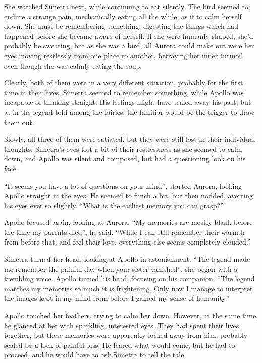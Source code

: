 She watched Simetra next, while continuing to eat silently. The bird seemed to endure a strange pain, mechanically eating all the while, as if to calm herself down. She must be remembering something, digesting the things which had happened before she became aware of herself. If she were humanly shaped, she'd probably be sweating, but as she was a bird, all Aurora could make out were her eyes moving restlessly from one place to another, betraying her inner turmoil even though she was calmly eating the soup.

Clearly, both of them were in a very different situation, probably for the first time in their lives. Simetra seemed to remember something, while Apollo was incapable of thinking straight. His feelings might have sealed away his past, but as in the legend told among the fairies, the familiar would be the trigger to draw them out. 

\fancybreaker{}

Slowly, all three of them were satiated, but they were still lost in their individual thoughts. Simetra's eyes lost a bit of their restlessness as she seemed to calm down, and Apollo was silent and composed, but had a questioning look on his face.

\enquote{It seems you have a lot of questions on your mind}, started Aurora, looking Apollo straight in the eyes. He seemed to flinch a bit, but then nodded, averting his eyes ever so slightly. \enquote{What is the earliest memory you can grasp?}

Apollo focused again, looking at Aurora. \enquote{My memories are mostly blank before the time my parents died}, he said. \enquote{While I can still remember their warmth from before that, and feel their love, everything else seems completely clouded.}

Simetra turned her head, looking at Apollo in astonishment. \enquote{The legend made me remember the painful day when your sister vanished}, she began with a trembling voice. Apollo turned his head, focusing on his companion. \enquote{The legend matches my memories so much it is frightening. Only now I manage to interpret the images kept in my mind from before I gained my sense of humanity.}

Apollo touched her feathers, trying to calm her down. However, at the same time, he glanced at her with sparkling, interested eyes. They had spent their lives together, but these memories were apparently locked away from him, probably sealed by a lock of painful loss. He feared what would come, but he had to proceed, and he would have to ask Simetra to tell the tale.

